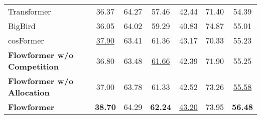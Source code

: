 \documentclass[nohyperref]{article}
\theoremstyle{plain}
\theoremstyle{definition}
\theoremstyle{remark}
\begin{document}
\begin{table*}[h]
\begin{small}
\begin{sc}
\begin{tabular}{l|ccccc|c}
				Transformer \citep{NIPS2017_3f5ee243} & 36.37 & 64.27 & 57.46 & 42.44 & 71.40 & 54.39 \\
				BigBird \citep{Zaheer2020BigBT} & 36.05 & 64.02 & 59.29 & 40.83 & 74.87 & 55.01 \\
				cosFormer \citep{anonymous2022cosformer} & \underline{37.90} & 63.41 & 61.36 & 43.17 & 70.33 & 55.23 \\
				\midrule
				\textbf{Flowformer w/o Competition} & 36.80 & 63.48 & \underline{61.66} & 42.39 & 71.90 & 55.25 \\
				\textbf{Flowformer w/o Allocation} & 37.00 & 63.78 & 61.33 & 42.52 & 73.26 & \underline{55.58} \\
				\textbf{Flowformer} & \textbf{38.70} & 64.29 & \textbf{62.24} & \underline{43.20} & 73.95 & \textbf{56.48} \\
				\bottomrule
			\end{tabular}
		\end{sc}
	\end{small}
    \vspace{-10pt}
\end{table*}
\end{document}
